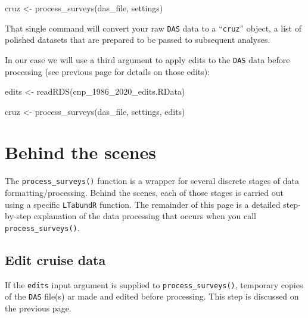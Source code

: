 \documentclass[
]{book}
\newenvironment{Shaded}{\begin{snugshade}}{\end{snugshade}}
\newcommand{\FunctionTok}[1]{\textcolor[rgb]{0.00,0.00,0.00}{#1}}
\newcommand{\NormalTok}[1]{#1}
\newcommand{\OtherTok}[1]{\textcolor[rgb]{0.56,0.35,0.01}{#1}}
\newcommand{\StringTok}[1]{\textcolor[rgb]{0.31,0.60,0.02}{#1}}
\begin{document}
\begin{Shaded}
\begin{Highlighting}[]
\NormalTok{cruz }\OtherTok{\textless{}{-}} \FunctionTok{process\_surveys}\NormalTok{(das\_file, }
\NormalTok{                        settings)}
\end{Highlighting}
\end{Shaded}

That single command will convert your raw \texttt{DAS} data to a ``\texttt{cruz}'' object, a list of polished datasets that are prepared to be passed to subsequent analyses.

In our case we will use a third argument to apply edits to the \texttt{DAS} data before processing (see previous page for details on those edits):

\begin{Shaded}
\begin{Highlighting}[]
\NormalTok{edits }\OtherTok{\textless{}{-}} \FunctionTok{readRDS}\NormalTok{(}\StringTok{\textquotesingle{}cnp\_1986\_2020\_edits.RData\textquotesingle{}}\NormalTok{)}

\NormalTok{cruz }\OtherTok{\textless{}{-}} \FunctionTok{process\_surveys}\NormalTok{(das\_file, }
\NormalTok{                        settings,}
\NormalTok{                        edits)}
\end{Highlighting}
\end{Shaded}

\hypertarget{behind-the-scenes}{%
\section*{Behind the scenes}\label{behind-the-scenes}}

The \texttt{process\_surveys()} function is a wrapper for several discrete stages of data formatting/processing. Behind the scenes, each of those stages is carried out using a specific \texttt{LTabundR} function. The remainder of this page is a detailed step-by-step explanation of the data processing that occurs when you call \texttt{process\_surveys()}.

\hypertarget{edit-cruise-data}{%
\subsection*{Edit cruise data}\label{edit-cruise-data}}

If the \texttt{edits} input argument is supplied to \texttt{process\_surveys()}, temporary copies of the \texttt{DAS} file(s) ar made and edited before processing. This step is discussed on the previous page.
\end{document}
